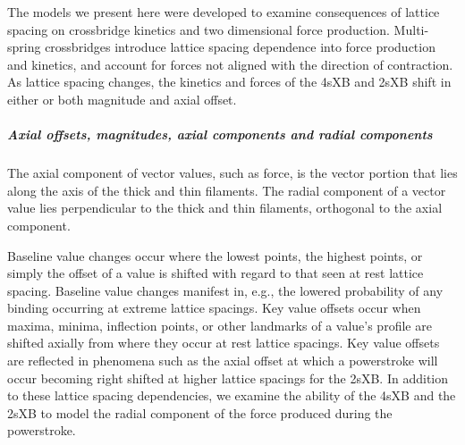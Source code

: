 \documentclass[]{article}
\begin{document}
The models we present here were developed to examine consequences of lattice spacing on crossbridge kinetics and two dimensional force production.
Multi-spring crossbridges introduce lattice spacing dependence into force production and kinetics, and account for forces not aligned with the direction of contraction.
As lattice spacing changes, the kinetics and forces of the 4sXB and 2sXB shift in either or both magnitude and axial offset.

\subparagraph{Axial offsets, magnitudes, axial components and radial components} %
The axial component of vector values, such as force, is the vector portion that lies along the axis of the thick and thin filaments.
The radial component of a vector value lies perpendicular to the thick and thin filaments, orthogonal to the axial component.

Baseline value changes occur where the lowest points, the highest points, or simply the offset of a value is shifted with regard to that seen at rest lattice spacing.
Baseline value changes manifest in, e.g., the lowered probability of any binding occurring at extreme lattice spacings. 
Key value offsets occur when maxima, minima, inflection points, or other landmarks of a value's profile are shifted axially from where they occur at rest lattice spacings.
Key value offsets are reflected in phenomena such as the axial offset at which a powerstroke will occur becoming right shifted at higher lattice spacings for the 2sXB.
In addition to these lattice spacing dependencies, we examine the ability of the 4sXB and the 2sXB to model the radial component of the force produced during the powerstroke.
\end{document}

